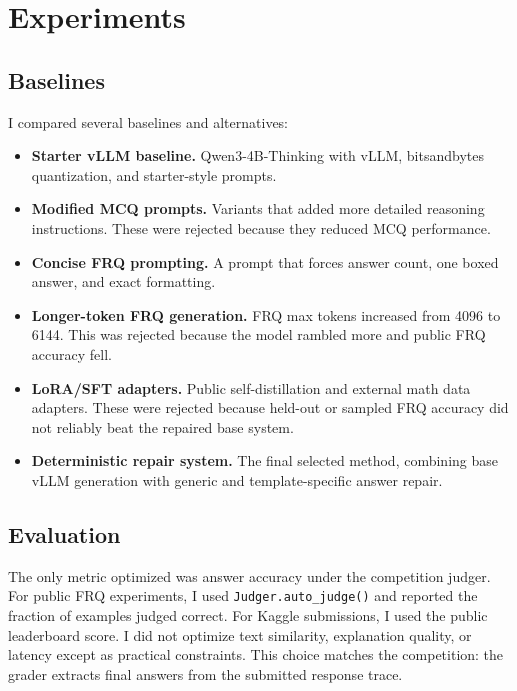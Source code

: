 \documentclass{article}
\begin{document}
\section{Experiments}
\label{sec:experiments}

\subsection{Baselines}
\label{sec:baselines}

I compared several baselines and alternatives:
\begin{itemize}
    \item \textbf{Starter vLLM baseline.} Qwen3-4B-Thinking with vLLM, bitsandbytes quantization, and starter-style prompts.
    \item \textbf{Modified MCQ prompts.} Variants that added more detailed reasoning instructions. These were rejected because they reduced MCQ performance.
    \item \textbf{Concise FRQ prompting.} A prompt that forces answer count, one boxed answer, and exact formatting.
    \item \textbf{Longer-token FRQ generation.} FRQ max tokens increased from 4096 to 6144. This was rejected because the model rambled more and public FRQ accuracy fell.
    \item \textbf{LoRA/SFT adapters.} Public self-distillation and external math data adapters. These were rejected because held-out or sampled FRQ accuracy did not reliably beat the repaired base system.
    \item \textbf{Deterministic repair system.} The final selected method, combining base vLLM generation with generic and template-specific answer repair.
\end{itemize}

\subsection{Evaluation}
\label{sec:evaluation}

The only metric optimized was answer accuracy under the competition judger. For public FRQ experiments, I used \texttt{Judger.auto\_judge()} and reported the fraction of examples judged correct. For Kaggle submissions, I used the public leaderboard score. I did not optimize text similarity, explanation quality, or latency except as practical constraints. This choice matches the competition: the grader extracts final answers from the submitted response trace.
\end{document}
